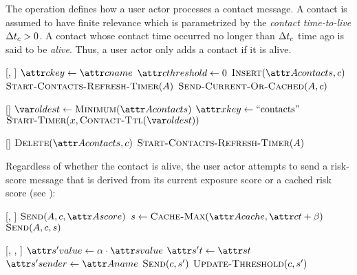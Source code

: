The \cHandleContactMessage operation defines how a user actor processes a contact message. A contact is assumed to have finite relevance which is parametrized by the \emph{contact time-to-live} ${\Delta}t_c > 0$. A contact whose contact time occurred no longer than ${\Delta}t_c$ time ago is said to be \emph{alive}. Thus, a user actor only adds a contact if it is alive.
%
\begin{function}{\nHandleContactMessage}[\vActor, \vContact]
    	\State $\aContactKey \assign \aContactName$
    	\State $\aContactThreshold \assign 0$
    	\State $\cInsert[\aActorContacts, \vContact]$
    	\State $\cStartContactsRefreshTimer[\vActor]$
    	\State $\cSendCurrentOrCached[\vActor, \vContact]$
    \EndIf
\end{function}
%
\begin{function}{\nStartContactsRefreshTimer}[\vActor]
    \State $\vOldest \assign \cMinimum[\aActorContacts]$
    \If{$\vOldest \notEquals \nil$}
    	\State $\aTimerKey \assign \text{``contacts''}$
    	\State $\cStartTimer[\vTimer, \cContactTtl[\vOldest]]$
    \EndIf
\end{function}
%
\begin{function}{\nHandleContactsRefreshTimer}[\vTimer]
    \ForEach{$\vContact \in \aActorContacts$}
    		\State $\cDelete[\aActorContacts, \vContact]$
    	\EndIf
    \EndFor
    \State $\cStartContactsRefreshTimer[\vActor]$
\end{function}
%
Regardless of whether the contact is alive, the user actor attempts to send a risk-score message that is derived from its current exposure score or a cached risk score (see ):
%
\begin{function}{\nSendCurrentOrCached}[\vActor, \vContact]
    \If{$\cShouldReceive[\vContact, \aActorScore]$} \label{step:send-current}
    	\State $\cSend[\vActor, \vContact, \aActorScore]$
    \Else
    	\State $\vScore \assign \cCacheMax[\aActorCache, \aContactTime + \pTimeBuffer]$ \label{step:cache-max}
    		\State $\cSend[\vActor, \vContact, \vScore]$
    	\EndIf
    \EndIf
\end{function}
%
\begin{function}{\nSend}[\vActor, \vContact, \vScore]
    \State $\aSentScoreValue \assign \pTransRate \cdot \aScoreValue$
    \State $\aSentScoreTime \assign \aScoreTime$
    \State $\aSentScoreSender \assign \aActorName$
    \State $\cSend[\vContact, \vSentScore]$
    \State $\cUpdateThreshold[\vContact, \vSentScore]$
\end{function}

